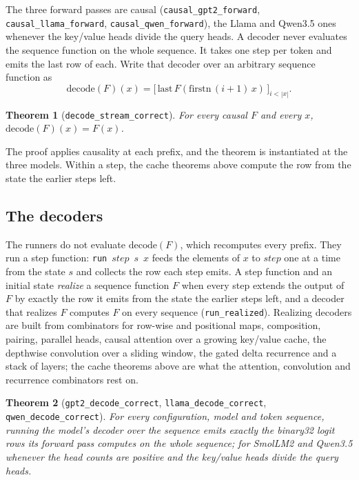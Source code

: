 \documentclass[11pt]{article}
\theoremstyle{plain}
\newtheorem{theorem}{Theorem}[section]
\theoremstyle{definition}
\newcommand{\code}[1]{\texttt{#1}}
\begin{document}
The three forward passes are causal (\code{causal\_gpt2\_forward},
\code{causal\_llama\_forward}, \code{causal\_qwen\_forward}), the Llama and
Qwen3.5 ones whenever the key/value heads divide the query heads. A decoder
never evaluates the sequence function on the whole sequence. It takes one step
per token and emits the last row of each. Write that decoder over an arbitrary
sequence function as
\[
  \mathrm{decode}(F)(x) =
  \bigl[\,\mathrm{last}\,F(\mathrm{firstn}\,(i{+}1)\,x)\,\bigr]_{i < |x|}.
\]

\begin{theorem}[\code{decode\_stream\_correct}]
For every causal $F$ and every $x$, $\mathrm{decode}(F)(x) = F(x)$.
\end{theorem}

The proof applies causality at each prefix, and the theorem is instantiated at
the three models. Within a step, the cache theorems above compute the row from
the state the earlier steps left.

\subsection{The decoders}

The runners do not evaluate $\mathrm{decode}(F)$, which recomputes every
prefix. They run a step function: \code{run}~$\mathit{step}$~$s$~$x$ feeds the
elements of $x$ to $\mathit{step}$ one at a time from the state $s$ and
collects the row each step emits. A step function and an initial state
\emph{realize} a sequence function $F$ when every step extends the output of
$F$ by exactly the row it emits from the state the earlier steps left, and a
decoder that realizes $F$ computes $F$ on every sequence
(\code{run\_realized}). Realizing decoders are built from combinators for
row-wise and positional maps, composition, pairing, parallel heads, causal
attention over a growing key/value cache, the depthwise convolution over a
sliding window, the gated delta recurrence and a stack of layers; the cache
theorems above are what the attention, convolution and recurrence combinators
rest on.

\begin{theorem}[\code{gpt2\_decode\_correct}, \code{llama\_decode\_correct}, \code{qwen\_decode\_correct}]
For every configuration, model and token sequence, running the model's decoder
over the sequence emits exactly the binary32 logit rows its forward pass
computes on the whole sequence; for SmolLM2 and Qwen3.5 whenever the head
counts are positive and the key/value heads divide the query heads.
\end{theorem}
\end{document}

